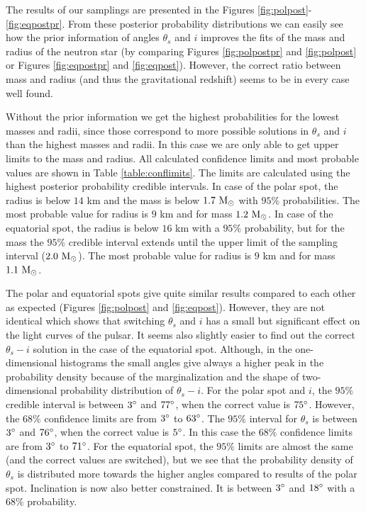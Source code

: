 \documentclass{wihuri}
\def\msun{{\rm M_{\odot}}}
\def\thetas{\theta_{s}}
\begin{document}
The results of our samplings are presented in the Figures \ref{fig:polpost}-\ref{fig:eqpostpr}. From these posterior probability distributions we can easily see how the prior information of angles $\thetas$ and $i$ improves the fits of the mass and radius of the neutron star (by comparing Figures \ref{fig:polpostpr} and \ref{fig:polpost} or Figures \ref{fig:eqpostpr} and \ref{fig:eqpost}). However, the correct ratio between mass and radius (and thus the gravitational redshift) seems to be in every case well found.

Without the prior information we get the highest probabilities for the lowest masses and radii, since those correspond to more possible solutions in  $\thetas$ and $i$ than the highest masses and radii. In this case we are only able to get upper limits to the mass and radius. All calculated confidence limits and most probable values are shown in Table \ref{table:conflimits}. The limits are calculated using the highest posterior probability credible intervals. In case of the polar spot, the radius is below $14$ km and the mass is below $1.7 ~\msun$ with $95 \%$ probabilities. The most probable value for radius is $9$ km and for mass $1.2 ~\msun$. In case of the equatorial spot, the radius is below $16$ km with a $95 \%$ probability, but for the mass the $95 \%$ credible interval extends until the upper limit of the sampling interval ($2.0 ~\msun$). The most probable value for radius is $9$ km and for mass $1.1 ~\msun$. 

The polar and equatorial spots give quite similar results compared to each other as expected (Figures \ref{fig:polpost} and \ref{fig:eqpost}). However, they are not identical which shows that switching $\thetas$ and $i$ has a small but significant effect on the light curves of the pulsar. It seems also slightly easier to find out the correct $\thetas-i$ solution in the case of the equatorial spot. Although, in the one-dimensional histograms the small angles give always a higher peak in the probability density because of the marginalization and the shape of two-dimensional probability distribution of $\thetas-i$. For the polar spot and $i$, the $95 \%$ credible interval is between $3 \degree$ and $77 \degree$, when the correct value is $75 \degree$. However, the $68 \%$ confidence limits are from $3 \degree$ to $63 \degree$. The $95 \%$ interval for $\thetas$ is between $3 \degree$ and $76 \degree$, when the correct value is $5 \degree$. In this case the $68 \%$ confidence limits are from $3 \degree$ to $71 \degree$. For the equatorial spot, the $95 \%$ limits are almost the same (and the correct values are switched), but we see that the probability density of $\thetas$ is distributed more towards the higher angles compared to results of the polar spot. Inclination is now also better constrained. It is between $3 \degree$ and $18 \degree$ with a $68 \%$ probability.
\end{document}
